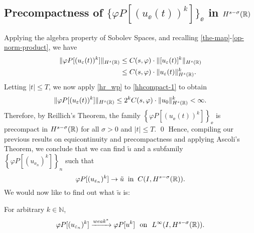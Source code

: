 \subsection{Precompactness of $\{\varphi P [(u_\ee(t))^k]\}_\ee$ in
$H^{s-\sigma  }(\mathbb{R})$}
Applying the algebra property of Sobolev
Spaces, and recalling \eqref{the-map}-\eqref{op-norm-product}, we have
\begin{equation}
\begin{split}
\label{hhcompact-1}
\|\varphi P [(u_\varepsilon(t))^k]\|_{H^{s}(\mathbb{R})}
& \le  C(s, \varphi) \cdot \|[u_\varepsilon(t)]^k\|_{H^{s}(\mathbb{R})}
\\
& \le C(s, \varphi) \cdot \|u_\varepsilon(t)\|^k_{H^{s}(\mathbb{R})}.
\end{split}
\end{equation}
%
Letting $|t| \le T$, we now apply \cref{hr_wp} to
\eqref{hhcompact-1} to obtain
\begin{equation*}
\begin{split}
\|\varphi P [(u_\varepsilon(t))^k]\|_{H^{s}(\mathbb{R})}
\le 2^k C(s, \varphi) \cdot  \|u_0 \|^k_{H^s(\mathbb{R})} < \infty.
\end{split}
\end{equation*}
Therefore, by Reillich's Theorem, the family $\left\{
\varphi P [(u_\ee(t))^k] \right\}_\ee$ is
precompact in $H^{s- \sigma }(\mathbb{R})$ for all $\sigma > 0$ and $|t| \le T$. \qed
Hence, compiling our previous results on equicontinuity and precompactness
and applying Ascoli's Theorem, we
conclude that we can find $\tilde{u}$ and a subfamily 
\\ $\left\{
\varphi P [(u_{\ee_n})^k]
\right\}_n$ such that
\begin{equation}
\label{hhstrong-conv-of-u_ep}
\varphi P [(u_{\varepsilon_n})^k] \to \tilde{u}
\; \; \text{in} \; \; C(I, H^{s-\sigma}(\mathbb{R})).
\end{equation}
%
%
We would now like to find out what $\tilde{u}$ is:
%
%
%
\begin{lemma}
\label{hhlem:crit-conv}
For arbitrary $k \in \mathbb{N}$,
\begin{equation}
\begin{split}
\varphi P [(u_{\varepsilon_n})^k] \xrightarrow{weak^*}
\varphi P [u^k] \ \ \text{on} \ \ L^\infty(I,
H^{s-\sigma}(\mathbb{R})).
\label{hhcrit-conv-est}
\end{split}
\end{equation}
\end{lemma}

